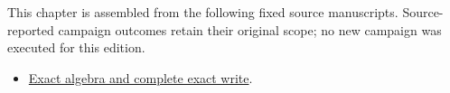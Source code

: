 This chapter is assembled from the following fixed source manuscripts.
Source-reported campaign outcomes retain their original scope; no new
campaign was executed for this edition.

\begin{itemize}
\tightlist
\item
  \href{https://github.com/iwtbotiwtwot/SAMA/blob/4c2b5dc1649da5900c90b90d0ce56c223dbb7717/vol_iii/03-writes-and-history/exact-algebra-and-complete-exact-write.md}{Exact
  algebra and complete exact write}.
\end{itemize}
